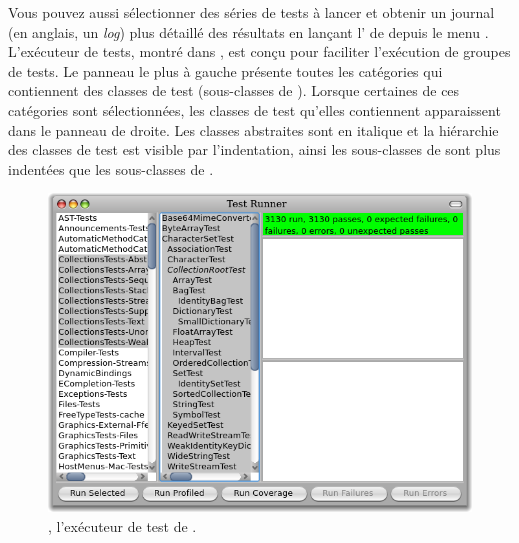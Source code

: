 \documentclass[a4paper,10pt,twoside]{book}
\begin{document}
Vous pouvez aussi sélectionner des séries de tests à lancer et obtenir un 
journal (en anglais, un \emph{log}) plus détaillé des
résultats en lançant  l'   de \sunit depuis le menu .
L'exécuteur de tests, montré dans , est conçu pour faciliter 
l'exécution de groupes de tests.
Le panneau le plus à gauche présente toutes les catégories qui
contiennent des classes de test (\ie  sous-classes de
). Lorsque certaines de ces catégories sont
sélectionnées, les classes de test qu'elles contiennent apparaissent
dans le panneau de droite.
Les classes abstraites sont en italique et la hiérarchie des classes de test est visible par l'indentation, ainsi les sous-classes de   sont plus indentées que les sous-classes de .

\begin{figure}[tbh]
  \begin{center}
	\includegraphics[width=\linewidth]{test-runner}
	\caption{\sunit, l'exécuteur de test de \pharo.}
  \end{center}
\end{figure}



\end{document}
